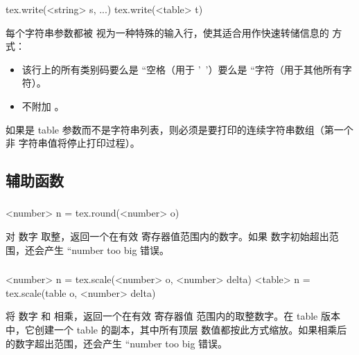 
\begin{typing}
tex.write(<string> s, ...)
tex.write(<table> t)
\end{typing}

每个字符串参数都被 \TEX 视为一种特殊的输入行，使其适合用作快速转储信息的
方式：

\begin{itemize}\item 该行上的所有类别码要么是 ``空格（用于 '~'）要么是 ``字符（用于其他所有字符）。
\item 不附加 。
\end{itemize}

如果是 table 参数而不是字符串列表，则必须是要打印的连续字符串数组（第一个非
字符串值将停止打印过程）。


\subsection{辅助函数}

\subsubsection{}



\begin{typing}
<number> n = tex.round(<number> o)
\end{typing}

对 \LUA 数字  取整，返回一个在有效 \TEX 寄存器值范围内的数字。如果
数字初始超出范围，还会产生 ``number too big 错误。

\subsubsection{}


\begin{typing}
<number> n = tex.scale(<number> o, <number> delta)
<table> n = tex.scale(table o, <number> delta)
\end{typing}

将 \LUA 数字  和  相乘，返回一个在有效 \TEX 寄存器值
范围内的取整数字。在 table 版本中，它创建一个 table 的副本，其中所有顶层
数值都按此方式缩放。如果相乘后的数字超出范围，还会产生 ``number too big
错误。

